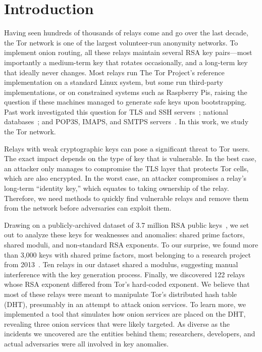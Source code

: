 \section{Introduction}
Having seen hundreds of thousands of relays come and go over the last decade,
the Tor network is one of the largest volunteer-run anonymity networks.  To
implement onion routing, all these relays maintain several RSA key pairs---most
importantly a medium-term key that rotates occasionally, and a long-term key
that ideally never changes.  Most relays run The Tor Project's reference
implementation on a standard Linux system, but some run third-party
implementations, or on constrained systems such as Raspberry Pis, raising the
question if these machines managed to generate safe keys upon bootstrapping.
Past work investigated this question for TLS and SSH
servers~\cite{Heninger2012a}; national  databases~\cite{Bernstein2013a}; and
POP3S, IMAPS, and SMTPS servers~\cite{Hastings2016a}.  In this work, we study
the Tor network.

Relays with weak cryptographic keys can pose a significant threat to Tor users.
The exact impact depends on the type of key that is vulnerable.  In the best
case, an attacker only manages to compromise the TLS layer that protects Tor
cells, which are also encrypted.  In the worst case, an attacker compromises a
relay's long-term ``identity key,'' which equates to taking ownership of the relay.
Therefore, we need methods to quickly find vulnerable relays and remove them
from the network before adversaries can exploit them.

Drawing on a publicly-archived dataset of 3.7 million RSA public
keys~\cite{collector}, we set out to analyze these keys for weaknesses and
anomalies: shared prime factors, shared moduli, and non-standard RSA exponents.
To our surprise, we found more than 3,000 keys with shared prime factors, most
belonging to a research project from 2013~\cite{Biryukov2013a}.  Ten relays in
our dataset shared a modulus, suggesting manual interference with the key
generation process.  Finally, we discovered 122 relays whose RSA exponent
differed from Tor's hard-coded exponent.  We believe that most of these relays
were meant to manipulate Tor's distributed hash table (DHT), presumably in an
attempt to attack onion services.  To learn more, we implemented a tool that
simulates how onion services are placed on the DHT, revealing three onion
services that were likely targeted.  As diverse as the incidents we uncovered
are the entities behind them; researchers, developers, and actual adversaries
were all involved in key anomalies.

